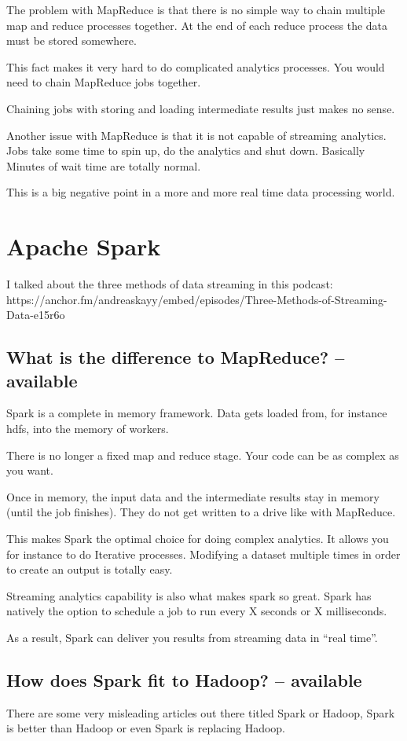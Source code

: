 \documentclass[12pt, numbers=noenddot]{scrreprt} %
\begin{document}
The problem with MapReduce is that there is no simple way to chain multiple map and reduce processes together. At the end of each reduce process the data must be stored somewhere.

This fact makes it very hard to do complicated analytics processes. You would need to chain MapReduce jobs together.

Chaining jobs with storing and loading intermediate results just makes no sense.

Another issue with MapReduce is that it is not capable of streaming analytics. Jobs take some time to spin up, do the analytics and shut down. Basically Minutes of wait time are totally normal.

This is a big negative point in a more and more real time data processing world.



\section{Apache Spark}
I talked about the three methods of data streaming in this podcast: https://anchor.fm/andreaskayy/embed/episodes/Three-Methods-of-Streaming-Data-e15r6o


\subsection{What is the difference to MapReduce? -- available}
Spark is a complete in memory framework. Data gets loaded from, for instance hdfs, into the memory of workers.

There is no longer a fixed map and reduce stage. Your code can be as complex as you want.

Once in memory, the input data and the intermediate results stay in memory (until the job finishes). They do not get written to a drive like with MapReduce.

This makes Spark the optimal choice for doing complex analytics. It allows you for instance to do Iterative processes. Modifying a dataset multiple times in order to create an output is totally easy.

Streaming analytics capability is also what makes spark so great. Spark has natively the option to schedule a job to run every X seconds or X milliseconds.

As a result, Spark can deliver you results from streaming data in “real time”.


\subsection{How does Spark fit to Hadoop? -- available}
There are some very misleading articles out there titled Spark or Hadoop, Spark is better than Hadoop or even Spark is replacing Hadoop.
\end{document}
